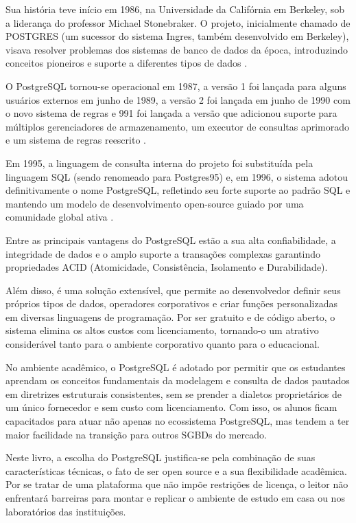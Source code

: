 Sua história teve início em 1986, na Universidade da Califórnia em Berkeley, sob a liderança do professor Michael Stonebraker. O projeto, inicialmente chamado de POSTGRES (um sucessor do sistema Ingres, também desenvolvido em Berkeley), visava resolver problemas dos sistemas de banco de dados da época, introduzindo conceitos pioneiros e suporte a diferentes tipos de dados \cite{ston86, ston87a}.

O PostgreSQL tornou-se operacional em 1987, a versão 1 foi lançada para alguns usuários externos em junho de 1989, a versão 2 foi lançada em junho de 1990 com o novo sistema de regras e 991 foi lançada a versão que adicionou suporte para múltiplos gerenciadores de armazenamento, um executor de consultas aprimorado e um sistema de regras reescrito \cite{ston90a,ston90b}. 

Em 1995, a linguagem de consulta interna do projeto foi substituída pela linguagem SQL (sendo renomeado para Postgres95) e, em 1996, o sistema adotou definitivamente o nome PostgreSQL, refletindo seu forte suporte ao padrão SQL e mantendo um modelo de desenvolvimento open-source guiado por uma comunidade global ativa \cite{postgresql_about}.

Entre as principais vantagens do PostgreSQL estão a sua alta confiabilidade, a integridade de dados e o amplo suporte a transações complexas garantindo propriedades ACID (Atomicidade, Consistência, Isolamento e Durabilidade). 

Além disso, é uma solução extensível, que permite ao desenvolvedor definir seus próprios tipos de dados, operadores corporativos e criar funções personalizadas em diversas linguagens de programação. Por ser gratuito e de código aberto, o sistema elimina os altos custos com licenciamento, tornando-o um atrativo considerável tanto para o ambiente corporativo quanto para o educacional.

No ambiente acadêmico, o PostgreSQL é adotado por permitir que os estudantes aprendam os conceitos fundamentais da modelagem e consulta de dados pautados em diretrizes estruturais consistentes, sem se prender a dialetos proprietários de um único fornecedor e sem custo com licenciamento. Com isso, os alunos ficam capacitados para atuar não apenas no ecossistema PostgreSQL, mas tendem a ter maior facilidade na transição para outros SGBDs do mercado.

Neste livro, a escolha do PostgreSQL justifica-se pela combinação de suas características técnicas, o fato de ser open source e a sua flexibilidade acadêmica. Por se tratar de uma plataforma que não impõe restrições de licença, o leitor não enfrentará barreiras para montar e replicar o ambiente de estudo em casa ou nos laboratórios das instituições. 

